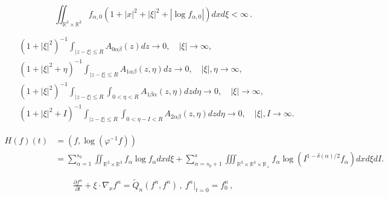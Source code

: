 \documentclass[10pt,a4paper]{amsart}
\def\R{\mathbb{R}}
\begin{document}
        \begin{equation}\label{fs0}
            \iint_{\R^3 \times \R^3} f_{\alpha,0} (1+|x|^2 +|\xi|^2 +|\log f_{\alpha,0}|)dxd\xi <\infty \,.
        \end{equation}

\begin{equation}\label{collision}
    \begin{aligned}
        & ( 1 + | \xi |^2 )^{-1} \int_{ | z - \xi | \leq R } A_{ 0 \alpha \beta } (z) d z \rightarrow 0, \quad | \xi | \rightarrow \infty, \\
        & ( 1 + | \xi |^2 +  \eta )^{-1} \int_{ | z -\xi | \leq R } A_{ 1 \alpha \beta } ( z, \eta ) d z \rightarrow 0,  \quad | \xi |,\eta  \rightarrow \infty, \\
        & ( 1 + | \xi |^2 )^{-1} \int_{ | z - \xi | \leq R } \int_{ 0 < \eta < R } A_{ 1 \beta \alpha } ( z, \eta ) d z d \eta \rightarrow 0, \quad | \xi | \rightarrow \infty , \\
        & ( 1 + | \xi |^2 +  I )^{-1} \int_{ | z - \xi | \leq R } \int_{ 0 < \eta - I < R } A_{ 2 \alpha \beta } ( z , \eta ) d z d \eta \rightarrow 0, \quad | \xi |, I \rightarrow \infty .
    \end{aligned}
\end{equation}

\begin{equation}\label{Hf}
	\begin{aligned}
		H(f)(t)& = (f,\log (\varphi^{-1} f) ) \\
		&=\sum \limits_{\alpha=1}^{s_0} \iint_{\R^3 \times \R^3 } f_\alpha \log f_\alpha  dxd\xi + \sum \limits_{\alpha = s_0+1}^{s}\iiint_{\R^3 \times \R^3 \times \R_+ } f_\alpha \log (I^{1-\delta(\alpha)/2} f_\alpha ) dxd\xi dI.
	\end{aligned}
\end{equation}

\begin{equation} \label{approximation}
		\tfrac{\partial f^n}{\partial t} +\xi \cdot \nabla_x f^n =\tilde{Q}_n(f^n, f^n) \,, \ f^n|_{t=0}=f^n_{0} \,,
\end{equation} 
\end{document}
